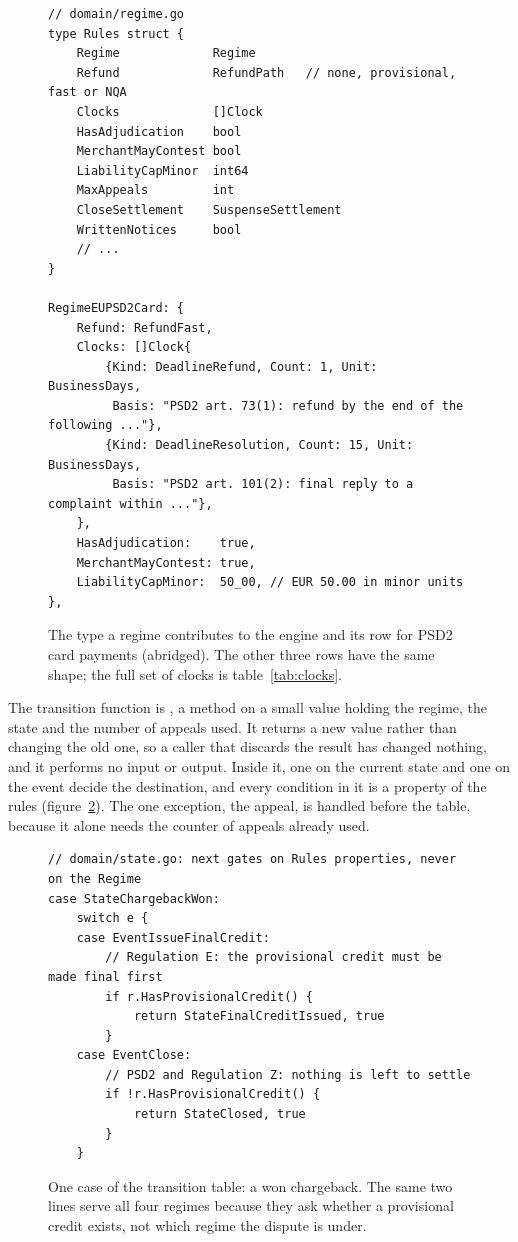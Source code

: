 \begin{figure}[htbp]
\begin{lstlisting}
// domain/regime.go
type Rules struct {
	Regime             Regime
	Refund             RefundPath   // none, provisional, fast or NQA
	Clocks             []Clock
	HasAdjudication    bool
	MerchantMayContest bool
	LiabilityCapMinor  int64
	MaxAppeals         int
	CloseSettlement    SuspenseSettlement
	WrittenNotices     bool
	// ...
}

RegimeEUPSD2Card: {
	Refund: RefundFast,
	Clocks: []Clock{
		{Kind: DeadlineRefund, Count: 1, Unit: BusinessDays,
		 Basis: "PSD2 art. 73(1): refund by the end of the following ..."},
		{Kind: DeadlineResolution, Count: 15, Unit: BusinessDays,
		 Basis: "PSD2 art. 101(2): final reply to a complaint within ..."},
	},
	HasAdjudication:    true,
	MerchantMayContest: true,
	LiabilityCapMinor:  50_00, // EUR 50.00 in minor units
},
\end{lstlisting}
\caption{The type a regime contributes to the engine and its row for PSD2 card payments (abridged). The other three
rows have the same shape; the full set of clocks is table~\ref{tab:clocks}.}
\label{fig:rules}
\end{figure}

The transition function is , a method on a small value holding the regime, the state and the
number of appeals used. It returns a new value rather than changing the old one, so a caller that discards the
result has changed nothing, and it performs no input or output. Inside it, one  on the current state
and one on the event decide the destination, and every condition in it is a property of the rules
(figure~\ref{fig:apply}). The one exception, the appeal, is handled before the table, because it alone needs the
counter of appeals already used.

\begin{figure}[htbp]
\begin{lstlisting}
// domain/state.go: next gates on Rules properties, never on the Regime
case StateChargebackWon:
	switch e {
	case EventIssueFinalCredit:
		// Regulation E: the provisional credit must be made final first
		if r.HasProvisionalCredit() {
			return StateFinalCreditIssued, true
		}
	case EventClose:
		// PSD2 and Regulation Z: nothing is left to settle
		if !r.HasProvisionalCredit() {
			return StateClosed, true
		}
	}
\end{lstlisting}
\caption{One case of the transition table: a won chargeback. The same two lines serve all four regimes because they
ask whether a provisional credit exists, not which regime the dispute is under.}
\label{fig:apply}
\end{figure}

